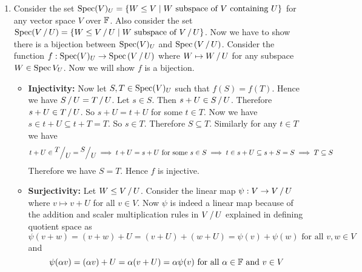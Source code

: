\documentclass[a4paper, 11pt]{article}
\begin{document}
{\begin{enumerate}[label=(\alph*)]
\begin{itemize}
	\item \textbf{Linear Map:} Let $v+T,w+T\in\quotient{V}{T}$ for some $v,w\in V$. Now $$\vph((v+w)+T)=(v+w)+U=(v+U)+(w+U)=\vph(v+T)+\vph(w+T)$$Let $\alpha\in\bbF$. Then we have $$\vph((\alpha v)+T)=(\alpha v)+U=\alpha(v+U)=\alpha \vph(v)$$Therefore $\vph$ is a well defined linear map.
	\item \textbf{Surjectivity:} Let $v+U\in \quotient{V}{U}$ for some $v\in V$. Since $T\leq U$, $v+T$ is  a vector of $\quotient{V}{T}$. Then $\vph(v+T)=v+U$. Therefore $\vph$ is surjective.
	\item $\boldsymbol{\ker\vph=\quotient{U}{T}}$\textbf{:} Let $v+T\in \ker\vph$ for some $v\in V$. Now $\vph(v+T)=0$. Hence $v+U=0+U\implies v\in U$. Therefore $v+T\in \quotient{U}{T}$ as $\quotient{U}T\leq \quotient{V}{T}$. Hence $\ker\vph\subseteq \quotient{U}{T}$. Now let $u+T\in\quotient{U}{T}$ for some $u\in U$. Since $\quotient{U}T\leq \quotient{V}{T}$, $u+T\in\quotient{V}{T}$. Now $\vph(u+T)=u+U=o+U$. Therefore $u+T\in\ker\vph$. Therefore we have $\ker\vph\supseteq \quotient{U}{T}$. Hence we have $$\ker{\vph}=\quotient{U}{T}$$
\end{itemize}
Therefore using first isomorphism theorem we have $$\quotient{\lt(\quotient{V}{T}\rt)}{\ker\vph}\cong\Im \vph\iff\quotient{\lt(\quotient{V}{T}\rt)}{\lt(\quotient{U}T\rt)}\cong \quotient{V}{U}$$
\item Consider the set $\operatorname{Spec}(V)_U=\{W\leq V\mid \text{$W$ subspace of $V$ containing $U$}\}$ for any vector space $V$ over $\mathbb{F}$. Also consider the set $\spec(\quotient{V}{U})=\{W\leq \quotient{V}{U}\mid \text{$W$ subspace of $\quotient{V}{U}$}\}$. Now we have to show there is a bijection between $\operatorname{Spec}(V)_U$ and $\spec\lt(\quotient{V}{U}\rt)$. Consider the function $f:\spec(V)_U\to \spec\lt(\quotient{V}U\rt)$ where $W\mapsto \quotient{W}{U}$ for any subspace $W\in \operatorname{Spec}{V}_U$. Now we will show $f$ is a bijection. \begin{itemize}
	\item \textbf{Injectivity:} Now let $S,T\in \operatorname{Spec}(V)_U$ such that $f(S)=f(T)$. Hence we have $\quotient{S}{U}=\quotient{T}{U}$. Let $s\in S$. Then $s+U\in \quotient{S}{U}$. Therefore $s+U\in \quotient{T}{U}$. So $s+U=t+U$ for some $t\in T$. Now we have $s\in t+U\subseteq t+T=T$. So $s\in T$. Therefore $S\subseteq T$. Similarly for any $t\in T$ we have $$t+U\in \quotient{T}{U}=\quotient{S}{U}\implies t+U=s+U\text{ for some $s\in S$}\implies t\in s+U\subseteq s+S=S\implies T\subseteq S$$Therefore we have $S=T$. Hence $f$ is injective.
	\item \textbf{Surjectivity:} Let $W\leq \quotient{V}{U}$. Consider the linear map $\psi: V\to \quotient{V}{U}$ where $v\mapsto v+U$ for all $v\in V$. Now $\psi $ is  indeed a linear map because of the addition and scaler multiplication rules in $\quotient{V}{U}$ explained in defining quotient space as $$\psi(v+w)=(v+w)+U=(v+U)+(w+U)=\psi(v)+\psi(w) \text{ for all $v,w\in V$} $$ and  $$\psi(\alpha v)=(\alpha v)+U=\alpha(v+U)=\alpha\psi(v)\text{ for all $\alpha\in\mathbb{F}$ and $v\in V$}$$
	

\end{itemize}
\end{enumerate}}
\end{document}
